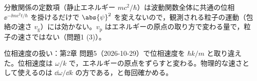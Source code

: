 \documentclass[uplatex,dvipdfmx,a4paper,11pt]{jsarticle}
\begin{document}
\matome
\begin{saitenichiran}
\end{saitenichiran}
\begin{daiji}
  \item 分散関係の定数項（静止エネルギー $mc^{2}/\hbar$）は波動関数全体に共通の位相 $\ee^{-\ii mc^{2}t/\hbar}$ を掛けるだけで $\abs{\psi}^{2}$ を変えないので，観測される粒子の運動（包絡の速さ $v_{\mathrm{g}}$）には効かない。$v_{\mathrm{p}}$ はエネルギーの原点の取り方で変わる量で，粒子の速さではない（問題1 (3)）。
\end{daiji}
\begin{maemo}
  \item 位相速度の扱い：第2章 問題5（2026-10-29）で位相速度を $\hbar k/m$ と取り違えた。位相速度は $\omega/k$ で，エネルギーの原点をずらすと変わる。物理的な速さとして使えるのは $\dd\omega/\dd k$ の方である，と毎回確かめる。
\end{maemo}
\end{document}
